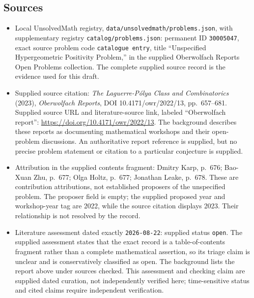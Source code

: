 \documentclass[11pt]{article}
\begin{document}
\subsection{Sources}
\begin{itemize}
\item Local UnsolvedMath registry, \texttt{data/unsolvedmath/problems.json}, with supplementary registry \texttt{catalog/problems.json}: permanent ID \texttt{30005047}, exact source problem code \texttt{catalogue entry}, title ``Unspecified Hypergeometric Positivity Problem,'' in the supplied Oberwolfach Reports Open Problems collection. The complete supplied source record is the evidence used for this draft.
\item Supplied source citation: \emph{The Laguerre-P\'olya Class and Combinatorics} (2023), \emph{Oberwolfach Reports}, DOI 10.4171/owr/2022/13, pp.~657--681. Supplied source URL and literature-source link, labeled ``Oberwolfach report'': \url{https://doi.org/10.4171/owr/2022/13}. The background describes these reports as documenting mathematical workshops and their open-problem discussions. An authoritative report reference is supplied, but no precise problem statement or citation to a particular conjecture is supplied.
\item Attribution in the supplied contents fragment: Dmitry Karp, p.~676; Bao-Xuan Zhu, p.~677; Olga Holtz, p.~677; Jonathan Leake, p.~678. These are contribution attributions, not established proposers of the unspecified problem. The proposer field is empty; the supplied proposed year and workshop-year tag are 2022, while the source citation displays 2023. Their relationship is not resolved by the record.
\item Literature assessment dated exactly \texttt{2026-08-22}: supplied status \texttt{open}. The supplied assessment states that the exact record is a table-of-contents fragment rather than a complete mathematical assertion, so its triage claim is unclear and is conservatively classified as open. The background lists the report above under sources checked. This assessment and checking claim are supplied dated curation, not independently verified here; time-sensitive status and cited claims require independent verification.
\end{itemize}
\end{document}

